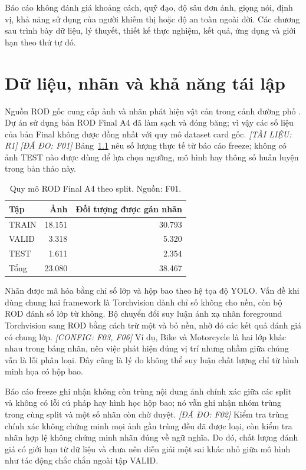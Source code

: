 \documentclass[12pt,a4paper,oneside]{report}
\newcommand{\measured}[1]{\textit{[ĐÃ ĐO: #1]}}
\newcommand{\configured}[1]{\textit{[CONFIG: #1]}}
\newcommand{\literature}[1]{\textit{[TÀI LIỆU: #1]}}
\begin{document}
Báo cáo không đánh giá khoảng cách, quỹ đạo, độ sâu đơn ảnh, giọng nói, định vị, khả năng sử dụng của người khiếm thị hoặc độ an toàn ngoài đời. Các chương sau trình bày dữ liệu, lý thuyết, thiết kế thực nghiệm, kết quả, ứng dụng và giới hạn theo thứ tự đó.

\chapter{Dữ liệu, nhãn và khả năng tái lập}\label{chap:data}
Nguồn ROD gốc cung cấp ảnh và nhãn phát hiện vật cản trong cảnh đường phố \cite{rod}. Dự án sử dụng bản ROD Final A4 đã làm sạch và đóng băng; vì vậy các số liệu của bản Final không được đồng nhất với quy mô dataset card gốc. \literature{R1} \measured{F01} Bảng~\ref{tab:split} nêu số lượng thực tế từ báo cáo freeze; không có ảnh TEST nào được dùng để lựa chọn ngưỡng, mô hình hay thông số huấn luyện trong bản thảo này.

\begin{table}[htbp]\centering
\caption{Quy mô ROD Final A4 theo split. Nguồn: F01.}\label{tab:split}
\begin{tabular}{lrr}\toprule
Tập & Ảnh & Đối tượng được gán nhãn\\\midrule
TRAIN & 18.151 & 30.793\\
VALID & 3.318 & 5.320\\
TEST & 1.611 & 2.354\\\midrule
Tổng & 23.080 & 38.467\\\bottomrule
\end{tabular}
\end{table}

Nhãn được mã hóa bằng chỉ số lớp và hộp bao theo hệ tọa độ YOLO. Vấn đề khi dùng chung hai framework là Torchvision dành chỉ số không cho nền, còn bộ ROD đánh số lớp từ không. Bộ chuyển đổi suy luận ánh xạ nhãn foreground Torchvision sang ROD bằng cách trừ một và bỏ nền, nhờ đó các kết quả đánh giá có chung lớp. \configured{F03, F06} Ví dụ, Bike và Motorcycle là hai lớp khác nhau trong bảng nhãn, nên việc phát hiện đúng vị trí nhưng nhầm giữa chúng vẫn là lỗi phân loại. Đây cũng là lý do không thể suy luận chất lượng chỉ từ hình minh họa có hộp bao.

Báo cáo freeze ghi nhận không còn trùng nội dung ảnh chính xác giữa các split và không có lỗi cú pháp hay hình học hộp bao; nó vẫn ghi nhận nhóm trùng trong cùng split và một số nhãn còn chờ duyệt. \measured{F02} Kiểm tra trùng chính xác không chứng minh mọi ảnh gần trùng đều đã được loại, còn kiểm tra nhãn hợp lệ không chứng minh nhãn đúng về ngữ nghĩa. Do đó, chất lượng đánh giá có giới hạn từ dữ liệu và chưa nên diễn giải một sai khác nhỏ giữa mô hình như tác động chắc chắn ngoài tập VALID.
\end{document}
